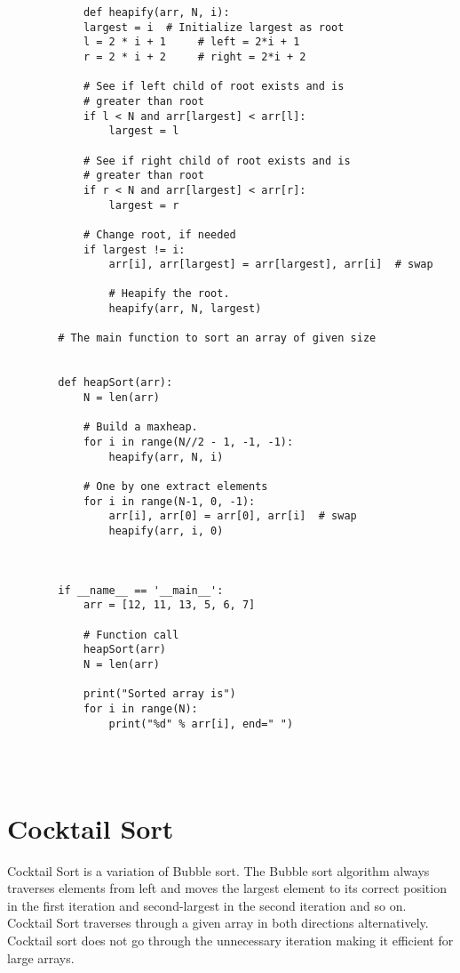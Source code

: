 \begin{verbatim}
            def heapify(arr, N, i):
            largest = i  # Initialize largest as root
            l = 2 * i + 1     # left = 2*i + 1
            r = 2 * i + 2     # right = 2*i + 2
          
            # See if left child of root exists and is
            # greater than root
            if l < N and arr[largest] < arr[l]:
                largest = l
          
            # See if right child of root exists and is
            # greater than root
            if r < N and arr[largest] < arr[r]:
                largest = r
          
            # Change root, if needed
            if largest != i:
                arr[i], arr[largest] = arr[largest], arr[i]  # swap
          
                # Heapify the root.
                heapify(arr, N, largest)
          
        # The main function to sort an array of given size
          
          
        def heapSort(arr):
            N = len(arr)
          
            # Build a maxheap.
            for i in range(N//2 - 1, -1, -1):
                heapify(arr, N, i)
          
            # One by one extract elements
            for i in range(N-1, 0, -1):
                arr[i], arr[0] = arr[0], arr[i]  # swap
                heapify(arr, i, 0)
          
          
        
        if __name__ == '__main__':
            arr = [12, 11, 13, 5, 6, 7]
          
            # Function call
            heapSort(arr)
            N = len(arr)
          
            print("Sorted array is")
            for i in range(N):
                print("%d" % arr[i], end=" ")
        
\end{verbatim}\\


\section*{Cocktail Sort}
     Cocktail Sort is a variation of Bubble sort. The Bubble sort algorithm always traverses elements from left and moves the largest element to its correct position in the first iteration and second-largest in the second iteration and so on. Cocktail Sort traverses through a given array in both directions alternatively. Cocktail sort does not go through the unnecessary iteration making it efficient for large arrays.

